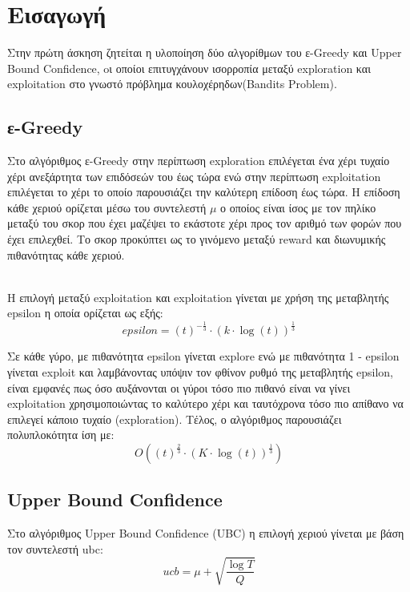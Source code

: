 \section*{Εισαγωγή}
Στην πρώτη άσκηση ζητείται η υλοποίηση δύο αλγορίθμων του ε-Greedy και Upper Bound Confidence, oι οποίοι επιτυγχάνουν ισορροπία μεταξύ exploration και exploitation στο γνωστό πρόβλημα κουλοχέρηδων(Bandits Problem). 

\subsection*{ε-Greedy}
\noindent
Στο αλγόριθμος ε-Greedy στην περίπτωση exploration επιλέγεται ένα χέρι τυχαίο χέρι ανεξάρτητα των επιδόσεών του έως τώρα ενώ στην περίπτωση exploitation επιλέγεται το χέρι το οποίο παρουσιάζει την καλύτερη επίδοση έως τώρα. Η επίδοση κάθε χεριού ορίζεται μέσω του συντελεστή $\mu$ ο οποίος είναι ίσος με τον πηλίκο μεταξύ του σκορ που έχει μαζέψει το εκάστοτε χέρι προς τον αριθμό των φορών που έχει επιλεχθεί. Το σκορ προκύπτει ως το γινόμενο μεταξύ reward και διωνυμικής πιθανότητας κάθε χεριού. 

\noindent\\
Η επιλογή μεταξύ exploitation και exploitation γίνεται με χρήση της μεταβλητής epsilon η οποία ορίζεται ως εξής:
\begin{equation*}
	epsilon = (t)^{-\frac{1}{3}} \cdot (k \cdot \log(t))^{\frac{1}{3}}
\end{equation*}

\noindent
Σε κάθε γύρο, με πιθανότητα epsilon γίνεται explore ενώ με πιθανότητα 1 - epsilon γίνεται exploit και λαμβάνοντας υπόψιν τον φθίνον ρυθμό της μεταβλητής epsilon, είναι εμφανές πως όσο αυξάνονται οι γύροι τόσο πιο πιθανό είναι να γίνει exploitation χρησιμοποιώντας το καλύτερο χέρι και ταυτόχρονα τόσο πιο απίθανο να επιλεγεί κάποιο τυχαίο (exploration). Τέλος, ο αλγόριθμος παρουσιάζει πολυπλοκότητα ίση με:
\begin{equation}
	O\left( (t)^{\frac{2}{3}} \cdot (K \cdot \log(t))^{\frac{1}{3}} \right)
\end{equation}



\subsection*{Upper Bound Confidence}
\noindent
Στο αλγόριθμος Upper Bound Confidence (UBC) η επιλογή χεριού γίνεται με βάση τον συντελεστή ubc:
\begin{equation}
	ucb = \mu + \sqrt{\frac{\log T}{Q} }
\end{equation}

